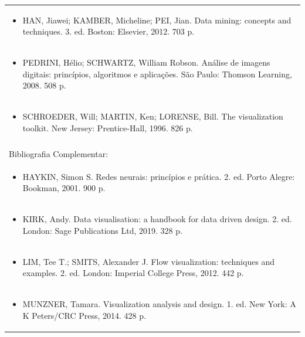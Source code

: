 \documentclass[11pt]{article}
\begin{document}
\begin{center}
\begin{longtable}{|p{4cm}|p{4cm}|p{4cm}|p{4cm}|}
\multicolumn{4}{|p{\dimexpr 16cm + 6\tabcolsep\relax}|}{\begin{itemize}\item HAN, Jiawei; KAMBER, Micheline; PEI, Jian. Data mining: concepts and techniques. 3. ed. Boston: Elsevier, 2012. 703 p.\end{itemize}}\\
\multicolumn{4}{|p{\dimexpr 16cm + 6\tabcolsep\relax}|}{\begin{itemize}\item PEDRINI, Hélio; SCHWARTZ, William Robson. Análise de imagens digitais: princípios, algoritmos e aplicações. São Paulo: Thomson Learning, 2008. 508 p.\end{itemize}}\\
\multicolumn{4}{|p{\dimexpr 16cm + 6\tabcolsep\relax}|}{\begin{itemize}\item SCHROEDER, Will; MARTIN, Ken; LORENSE, Bill. The visualization toolkit. New Jersey: Prentice-Hall, 1996. 826 p.\end{itemize}}\\
\multicolumn{4}{|p{16cm}|}{}\\
\hline
\multicolumn{4}{|p{16cm}|}{Bibliografia Complementar:}\\*
\multicolumn{4}{|p{\dimexpr 16cm + 6\tabcolsep\relax}|}{\begin{itemize}\item HAYKIN, Simon S. Redes neurais: princípios e prática. 2. ed. Porto Alegre: Bookman, 2001. 900 p.\end{itemize}}\\
\multicolumn{4}{|p{\dimexpr 16cm + 6\tabcolsep\relax}|}{\begin{itemize}\item KIRK, Andy. Data visualisation: a handbook for data driven design. 2. ed. London: Sage Publications Ltd, 2019. 328 p.\end{itemize}}\\
\multicolumn{4}{|p{\dimexpr 16cm + 6\tabcolsep\relax}|}{\begin{itemize}\item LIM, Tee T.; SMITS, Alexander J. Flow visualization: techniques and examples. 2. ed. London: Imperial College Press, 2012. 442 p.\end{itemize}}\\
\multicolumn{4}{|p{\dimexpr 16cm + 6\tabcolsep\relax}|}{\begin{itemize}\item MUNZNER, Tamara. Visualization analysis and design. 1. ed. New York: A K Peters/CRC Press, 2014. 428 p.\end{itemize}}\\

\end{longtable}
\end{center}
\end{document}
